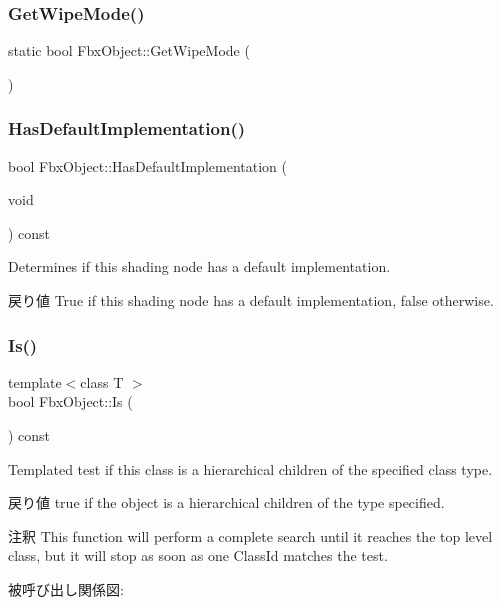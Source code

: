\subsubsection{\texorpdfstring{Get\+Wipe\+Mode()}{GetWipeMode()}}
{\footnotesize\ttfamily static bool Fbx\+Object\+::\+Get\+Wipe\+Mode (\begin{DoxyParamCaption}{ }\end{DoxyParamCaption})\hspace{0.3cm}{\ttfamily [static]}}

\mbox{\label{class_fbx_object_a9703e0631381d9bbc91cac102198cf36}} 
\subsubsection{\texorpdfstring{Has\+Default\+Implementation()}{HasDefaultImplementation()}}
{\footnotesize\ttfamily bool Fbx\+Object\+::\+Has\+Default\+Implementation (\begin{DoxyParamCaption}\item[{void}]{ }\end{DoxyParamCaption}) const}

Determines if this shading node has a default implementation. \begin{DoxyReturn}{戻り値}
{\ttfamily True} if this shading node has a default implementation, {\ttfamily false} otherwise. 
\end{DoxyReturn}
\mbox{\label{class_fbx_object_a65e47d62ed950247cd097b3b505d7b48}} 
\subsubsection{\texorpdfstring{Is()}{Is()}}
{\footnotesize\ttfamily template$<$class T $>$ \\
bool Fbx\+Object\+::\+Is (\begin{DoxyParamCaption}{ }\end{DoxyParamCaption}) const}

Templated test if this class is a hierarchical children of the specified class type. \begin{DoxyReturn}{戻り値}
{\ttfamily true} if the object is a hierarchical children of the type specified. 
\end{DoxyReturn}
\begin{DoxyRemark}{注釈}
This function will perform a complete search until it reaches the top level class, but it will stop as soon as one Class\+Id matches the test. 
\end{DoxyRemark}
被呼び出し関係図\+:
\mbox{\label{class_fbx_object_a5898e582711f3266ac3d0f779d541ef6}} 
